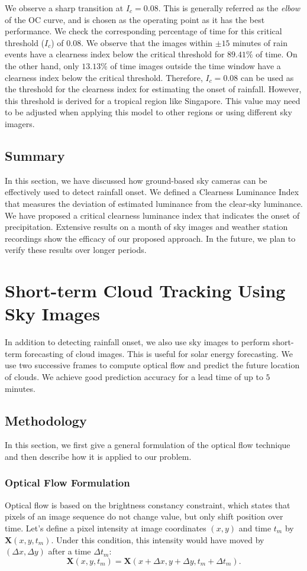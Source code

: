 We observe a sharp transition at $I_c = 0.08$. This is generally referred as the \emph{elbow} of the OC curve, and is chosen as the operating point as it has the best performance. 
We check the corresponding percentage of time for this critical threshold ($I_c$) of $0.08$. We observe that the images within $\pm 15$ minutes of rain events have a clearness index below the critical threshold for $89.41\%$ of time. On the other hand, only $13.13\%$ of time images outside the time window have a clearness index below the critical threshold. 
Therefore, $I_c=0.08$ can be used as the threshold for the clearness index for estimating the onset of rainfall. However, this threshold is derived for a tropical region like Singapore. This value may need to be adjusted when applying this model to other regions or using different sky imagers.

\subsection{Summary}
In this section, we have discussed how ground-based sky cameras can be effectively used to detect rainfall onset. We defined a Clearness Luminance Index that measures the deviation of estimated luminance from the clear-sky luminance. We have proposed a critical clearness luminance index that indicates the onset of precipitation. Extensive results on a month of sky images and weather station recordings show the efficacy of our proposed approach. In the future, we plan to verify these results over longer periods.

\section{Short-term Cloud Tracking Using Sky Images}
\label{sec:trackclouds}
In addition to detecting rainfall onset, we also use sky images to perform short-term forecasting of cloud images. This is useful for solar energy forecasting. We use two successive frames to compute optical flow and predict the future location of clouds. We achieve good prediction accuracy for a lead time of up to $5$ minutes.

\subsection{Methodology}
In this section, we first give a general formulation of the optical flow technique and then describe how it is applied to our problem.

\subsubsection{Optical Flow Formulation}
Optical flow is based on the brightness constancy constraint, which states that pixels of an image sequence do not change value, but only shift position over time. Let's define a pixel intensity at image coordinates $(x,y)$ and time $t_m$ by $\mathbf{X}(x,y,t_m)$. Under this condition, this intensity would have moved by $(\Delta x, \Delta y)$ after a time $\Delta t_m$:
\[\mathbf{X}(x,y,t_m) = \mathbf{X}(x + \Delta x, y + \Delta y, t_m + \Delta t_m).\]

